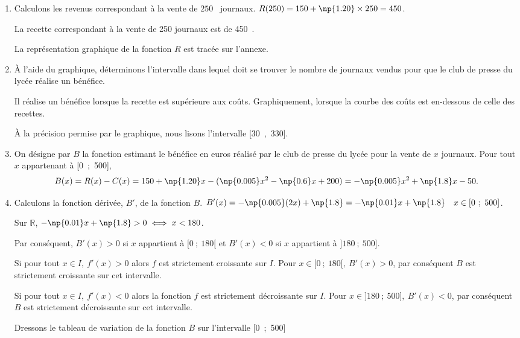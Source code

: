 \documentclass[10pt,a4paper]{article}
\newcommand{\euro}{\eurologo{}}
\newcommand{\R}{\mathbb{R}}
\begin{document}
\begin{enumerate}
\item Calculons les revenus correspondant à la vente de $250$~ journaux. $R(250)=150+\np{1.20}\times 250=450$.

La recette correspondant à la vente de 250 journaux est de 450~\euro.

 La représentation graphique de la fonction $R$ est tracée sur l’annexe.
\item  À l'aide du graphique, déterminons l'intervalle dans lequel doit se trouver le nombre de journaux vendus pour que le club de presse du lycée réalise un bénéfice. 

Il réalise un bénéfice lorsque la recette est supérieure aux coûts. Graphiquement, lorsque la courbe des coûts est en-dessous de celle des recettes.

 À la précision permise par le graphique, nous lisons l'intervalle [30~,~330].

\item On désigne par $B$ la fonction estimant le bénéfice en euros réalisé par le club de presse du lycée pour la vente de $x$  journaux. Pour tout $x$ appartenant à [0~;~500],
\[B(x)=R(x)-C(x)=150+\np{1.20}x-(\np{0.005}x^2-\np{0.6}x+200)=-\np{0.005}x^2+\np{1.8}x-50.\]

\item Calculons la fonction dérivée, $B'$, de la fonction $B$. $B'(x)= -\np{0.005}(2x)+\np{1.8}=-\np{0.01}x+\np{1.8}\quad  x \in [0~;~500]$.

Sur $\R$, $-\np{0.01}x+\np{1.8}>0 \iff x<180$. 

Par conséquent, $B'(x)>0$ si $x$ appartient à $[0~;~180[$ et $B'(x)<0$ si $x$ appartient à $]180~;~500]$.

Si pour tout $x\in I,\:f'(x)> 0$ alors $f$ est strictement croissante sur $I$. Pour $x\in [0~;~180[,\ B'(x)>0$, par conséquent $B$ est strictement croissante sur cet intervalle.

Si pour tout $x\in I,\:f'(x)<0 $ alors la fonction $f$ est strictement décroissante sur $I$. Pour $x\in ]180~;~500],\ B'(x)<0$, par conséquent $B$ est strictement décroissante sur cet intervalle.
 
Dressons le tableau de variation de la fonction $B$ sur l’intervalle [0~;~500]


\end{enumerate}
\end{document}
